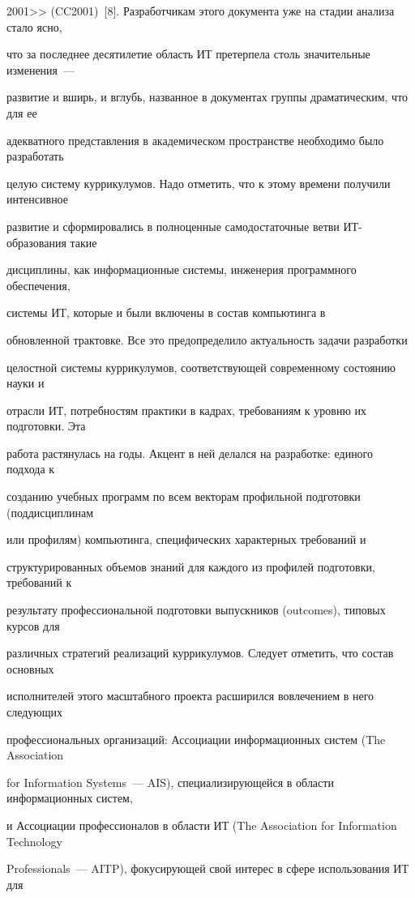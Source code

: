 2001>> (CC2001)~[8]. Разработчикам этого документа уже на стадии анализа стало ясно, 

что за последнее десятилетие область ИТ претерпела столь значительные изменения~--- 

развитие и вширь, и вглубь, названное в документах группы драматическим, что для ее 

адекватного представления в академическом пространстве необходимо было разработать 

целую систему куррикулумов. Надо отметить, что к этому времени получили интенсивное 

развитие и сформировались в полноценные самодостаточные ветви ИТ-обра\-зо\-ва\-ния такие 

дисциплины, как информационные системы, инженерия программного обеспечения, 

сис\-те\-мы ИТ, которые и были включены в состав компьютинга в 

обновленной трактовке. Все это предопределило актуальность задачи разработки 

целостной системы куррикулумов, соответствующей современному состоянию науки и 

отрасли ИТ, потребностям практики в кадрах, требованиям к уровню их подготовки. Эта 

работа растянулась на годы. Акцент в ней делался на разработке: единого подхода к 

созданию учебных программ по всем векторам профильной подготовки (поддисциплинам 

или профилям) компьютинга, специфических характерных требований и 

структурированных объемов знаний для каждого из профилей подготовки, требований к 

результату профессиональной подготовки выпускников (outcomes), типовых курсов для 

различных стратегий реализаций куррикулумов. Следует отметить, что состав основных 

исполнителей этого масштабного проекта расширился вовлечением в него следующих 

профессиональных организаций: Ассоциации информационных систем (The Association 

for Information Systems~--- AIS), специализирующейся в области информационных систем, 

и Ассоциации профессионалов в области ИТ (The Association for Information Technology 

Professionals~--- AITP), фокусирующей свой интерес в сфере использования ИТ для 

